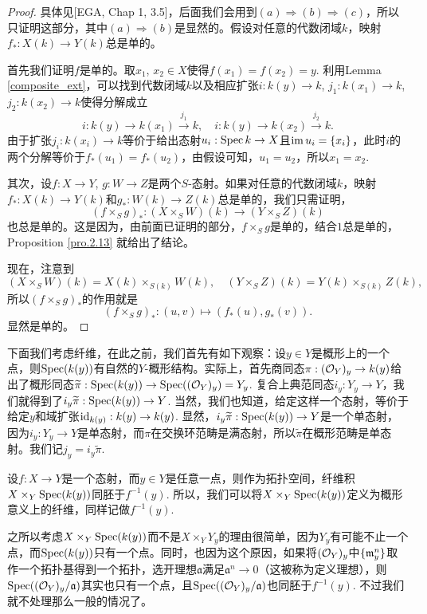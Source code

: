 \begin{proof}
具体见[EGA, Chap 1, 3.5]，后面我们会用到$(a)\Rightarrow (b)\Rightarrow (c)$，所以只证明这部分，其中$(a)\Rightarrow (b)$是显然的。假设对任意的代数闭域$k$，映射$f_*:X(k)\to Y(k)$总是单的。

首先我们证明$f$是单的。取$x_1$, $x_2\in X$使得$f(x_1)=f(x_2)=y$. 利用Lemma \ref{composite_ext}，可以找到代数闭域$k$以及相应扩张$i:k(y)\to k$, $j_1:k(x_1)\to k$, $j_2:k(x_2)\to k$使得分解成立
\[
	i:k(y)\to k(x_1)\xrightarrow{j_1} k,\quad i:k(y)\to k(x_2)\xrightarrow{j_2} k.
\]
由于扩张$j_i:k(x_i)\to k$等价于给出态射$u_i:\operatorname{Spec} k\to X$且$\operatorname{im} u_i=\{x_i\}$，此时$i$的两个分解等价于$f_*(u_1)=f_*(u_2)$，由假设可知，$u_1=u_2$，所以$x_1=x_2$.

其次，设$f:X\to Y$, $g:W\to Z$是两个$S$-态射。如果对任意的代数闭域$k$，映射$f_*:X(k)\to Y(k)$和$g_*:W(k)\to Z(k)$总是单的，我们只需证明，
\[
	(f\times_S g)_*:(X\times_S W)(k)\to (Y\times_S Z)(k)
\]
也总是单的。这是因为，由前面已证明的部分，$f\times_S g$是单的，结合$1$总是单的，Proposition \ref{pro.2.13} 就给出了结论。

现在，注意到
\[
	(X\times_S W)(k)=X(k)\times_{S(k)}W(k),\quad (Y\times_S Z)(k)=Y(k)\times_{S(k)}Z(k),
\]
所以$(f\times_S g)_*$的作用就是
\[
	(f\times_S g)_*:(u,v)\mapsto (f_*(u),g_*(v)).
\]
显然是单的。
\end{proof}

下面我们考虑纤维，在此之前，我们首先有如下观察：设$y\in Y$是概形上的一个点，则$\operatorname{Spec} (k(y))$有自然的$Y$-概形结构。实际上，首先商同态$\pi:(\mathcal{O}_{Y})_y\to k(y)$给出了概形同态$\widetilde{\pi}:\operatorname{Spec}(k(y))\to \operatorname{Spec} ((\mathcal{O}_{Y})_y)=Y_y$. 复合上典范同态$i_y:Y_y\to Y$，我们就得到了$i_y\widetilde{\pi}:\operatorname{Spec}(k(y))\to Y$. 当然，我们也知道，给定这样一个态射，等价于给定$y$和域扩张$\operatorname{id}_{k(y)}:k(y)\to k(y)$. 显然，$i_y\widetilde{\pi}:\operatorname{Spec}(k(y))\to Y$是一个单态射，因为$i_y:Y_y\to Y$是单态射，而$\pi$在交换环范畴是满态射，所以$\widetilde{\pi}$在概形范畴是单态射。我们记$j_y=i_y\widetilde{\pi}$.

\begin{pro}[纤维]\label{fiber}
设$f:X\to Y$是一个态射，而$y\in Y$是任意一点，则作为拓扑空间，纤维积$X\times_Y\operatorname{Spec} (k(y))$同胚于$f^{-1}(y)$. 所以，我们可以将$X\times_Y\operatorname{Spec} (k(y))$定义为概形意义上的纤维，同样记做$f^{-1}(y)$.
\end{pro}

之所以考虑$X\times_Y\operatorname{Spec} (k(y))$而不是$X\times_Y Y_y$的理由很简单，因为$Y_y$有可能不止一个点，而$\operatorname{Spec} (k(y))$只有一个点。同时，也因为这个原因，如果将$(\mathcal{O}_Y)_y$中$\{\mathfrak{m}_y^n\}$取作一个拓扑基得到一个拓扑，选开理想$\mathfrak{a}$满足$\mathfrak{a}^n\to 0$（这被称为定义理想），则$\operatorname{Spec}((\mathcal{O}_Y)_y/\mathfrak{a})$其实也只有一个点，且$\operatorname{Spec}((\mathcal{O}_Y)_y/\mathfrak{a})$也同胚于$f^{-1}(y)$. 不过我们就不处理那么一般的情况了。

